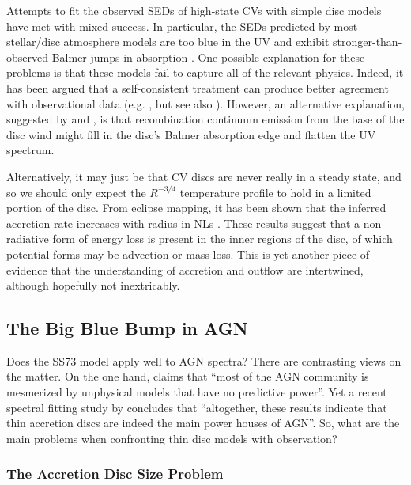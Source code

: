 Attempts to fit the observed SEDs of high-state CVs with simple disc models 
have met with mixed success. In
particular, the SEDs predicted by most stellar/disc atmosphere models 
are too blue in the UV \citep{wade1988,long1991,long1994,knigge1998} and exhibit
stronger-than-observed Balmer jumps in absorption 
\citep{wade1984,haug1987,ladous1989b,knigge1998}. One possible
explanation for these problems is that these models fail to capture
all of the relevant physics. Indeed, it has been argued that a
self-consistent treatment can produce better agreement with 
observational data (e.g. \citealt{shaviv1991}, but see also \citealt{idanshaviv2010}).
However, an alternative explanation, suggested by 
\cite{KLWB98} and \cite{hassall}, 
is that recombination continuum emission from the base of the 
disc wind might fill in the disc's Balmer absorption edge and flatten 
the UV spectrum. 

Alternatively, it may just be that CV discs are never really in
a steady state, and so we should only expect the $R^{-3/4}$
temperature profile to hold in a limited portion of the disc.
From eclipse mapping, it has been shown that the inferred accretion
rate increases with radius in NLs \citep{rutten1992, horne1993}.
These results suggest that a non-radiative form of energy loss
is present in the inner regions of the disc, of which potential forms
may be advection or mass loss. This is yet another piece of evidence
that the understanding of accretion and outflow 
are intertwined, although hopefully not inextricably.

\subsection{The Big Blue Bump in AGN}

Does the SS73 model apply well to AGN spectra? There are contrasting views on the matter.
On the one hand, \cite{antonucci2013} claims that ``most of the AGN community is mesmerized by unphysical models that have no predictive power''. 
Yet a recent spectral fitting study by \cite{capellupo2015} concludes that 
``altogether, these results indicate that thin accretion discs are indeed the 
main power houses of AGN''. So, what are the main problems when 
confronting thin disc models with observation? 

\subsubsection{The Accretion Disc Size Problem}

